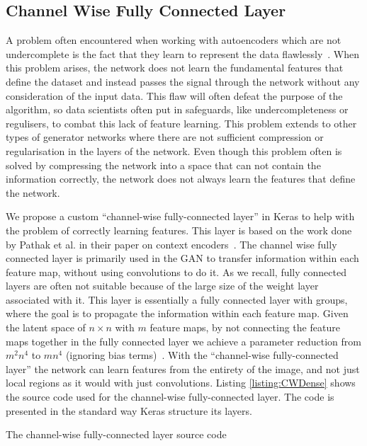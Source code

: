 \subsection{Channel Wise Fully Connected Layer}
\label{cha:CWDense}
A problem often encountered when working with autoencoders which are not undercomplete is the fact that they learn to represent the data flawlessly~\cite{OvercompleteAE}.
When this problem arises, the network does not learn the fundamental features that define the dataset and instead passes the signal through the network without any consideration of the input data.
This flaw will often defeat the purpose of the algorithm, so data scientists often put in safeguards, like undercompleteness or regulisers, to combat this lack of feature learning. 
This problem extends to other types of generator networks where there are not sufficient compression or regularisation in the layers of the network.
Even though this problem often is solved by compressing the network into a space that can not contain the information correctly, the network does not always learn the features that define the network. 

We propose a custom ``channel-wise fully-connected layer'' in Keras to help with the problem of correctly learning features. This layer is based on the work done by Pathak et al. in their paper on context encoders~\cite{Pathak_2016}.
The channel wise fully connected layer is primarily used in the GAN to transfer information within each feature map, without using convolutions to do it. As we recall, fully connected layers are often not suitable because of the large size of the weight layer associated with it. This layer is essentially a fully connected layer with groups, where the goal is to propagate the information within each feature map.
Given the latent space of $n \times n$ with $m$ feature maps, by not connecting the feature maps together in the fully connected layer we achieve a parameter reduction from $m^2n^4$ to $mn^4$ (ignoring bias terms)~\cite{Pathak_2016}.
With the ``channel-wise fully-connected layer'' the network can learn features from the entirety of the image, and not just local regions as it would with just convolutions. 
Listing \ref{listing:CWDense} shows the source code used for the channel-wise fully-connected layer. The code is presented in the standard way Keras structure its layers. 

\begin{listing}

\caption{The channel-wise fully-connected layer source code}
\label{listing:CWDense}
\end{listing}

